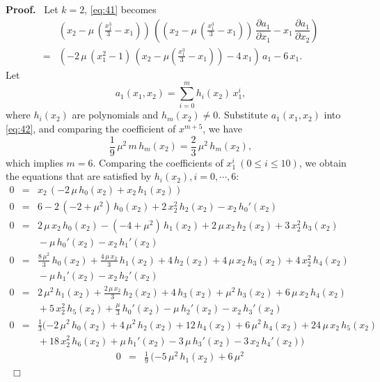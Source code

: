 \documentclass[preprint, 12pt]{elsarticle}
\numberwithin{equation}{section}
\newenvironment{proof}[1][Proof]{\textbf{#1.}\ }{\ $\Box$}
\begin{document}
\begin{proof}
Let $k = 2$, \eqref{eq:41} becomes
\begin{equation}
\label{eq:42} \begin{array}{rl} &(x_2 - \mu\,
(\frac{x_1^3}{3} - x_1))\, ((x_2 -
\mu\,(\frac{x_1^3}{3} - x_1))\, \dfrac{\partial a_1}{\partial x_1}
-x_1\, \dfrac{\partial a_1}{\partial x_2})\\
 = &(-2\,
\mu\, (x_1^2 - 1)\, (x_2 - \mu (\frac{x_1^3}{3} - x_1)) - 4\,
x_1)\,a_1 - 6\, x_1.
\end{array}
\end{equation}
Let
$$a_1(x_1,x_2) = \sum_{i = 0}^m h_i(x_2)\,  x_1^i,$$
where $h_i(x_2)$ are polynomials and $h_m(x_2) \not=0$. Substitute
$a_1(x_1,x_2)$ into \eqref{eq:42}, and comparing the coefficient
of $x^{m+5}$, we have
$$\frac{1}{9}\,  \mu^2\, m\, h_m(x_2) = \frac{2}{3}\, \mu^2\, h_m(x_2),$$
which implies $m = 6$. Comparing the coefficients of $x_1^{i}\ ( 0\leq
i\leq 10)$, we obtain the equations that are satisfied by $h_i(x_2), i
= 0,\cdots , 6$:
\begin{eqnarray*}
0 &=& x_2\, ( -2\, \mu\,   h_0(x_2) +
x_2\,  h_1(x_2) )\\
0 &=& 6 - 2\, ( -2 + {\mu }^2)\,   h_0(x_2)
+ 2\, x_2^2\,  h_2(x_2) - x_2\,  h_0'(x_2)\\
0 &=& 2\, \mu\, x_2\, h_0(x_2) - ( -4 + {\mu }^2 )\, h_1(x_2) +
2\, \mu\, x_2\, h_2(x_2) +
  3\, x_2^2\,  h_3(x_2)\\
&&{} - \mu\, h_0'(x_2) -
  x_2\,h_1'(x_2)\\
 0 &=& \frac{8\, \mu^2}{3}\,  h_0(x_2) + \frac{4\, \mu\, x_2 }{3}
\,h_1(x_2) + 4\,  h_2(x_2) +
  4\, \mu\, x_2\,   h_3(x_2) + 4\, x_2^2\,  h_4(x_2)\\
&&{} - \mu\,   h_1'(x_2) -
  x_2\,  h_2'(x_2)\\
0 &=& 2\, {\mu }^2\,  h_1(x_2) + \frac{2\, \mu\, x_2 }{3}\,
h_2(x_2) + 4\, h_3(x_2) +
  {\mu }^2\,  h_3(x_2) + 6\, \mu\, x_2\,   h_4(x_2)\\
  &&{} + 5\, x_2^2\,  h_5(x_2) +
  \frac{\mu }{3}\,  h_0'(x_2) - \mu\,   h_2'(x_2) -
  x_2\,  h_3'(x_2)\\
0 &=& \frac{1}{3}(-2\, {\mu }^2 \, h_0(x_2) + 4\, {\mu }^2\,
h_2(x_2) + 12\, h_4(x_2) +
    6\, {\mu }^2\,  h_4(x_2) + 24\, \mu\, x_2\,   h_5(x_2)\\
    &&{} + 18\, x_2^2\,  h_6(x_2) +
    \mu\,   h_1'(x_2) - 3\, \mu\, h_3'(x_2) -
    3\, x_2\,  h_4'(x_2))
\end{eqnarray*}
 \begin{eqnarray*}
0 &=& \frac{1}{9}\,(-5\, {\mu }^2\,  h_1(x_2) + 6\, {\mu }^2\,

\end{eqnarray*}
\end{proof}
\end{document}
